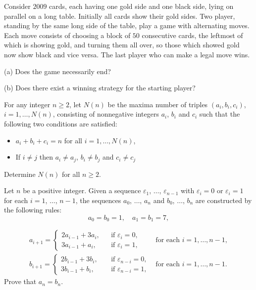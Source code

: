 \item[\textbf{C1.}]
Consider 
$2009$
 cards, each having one gold side and one black side, lying on parallel on a long table. Initially all cards show their gold sides. Two player, standing by the same long side of the table, play a game with alternating moves. Each move consists of choosing a block of 
$50$
 consecutive cards, the leftmost of which is showing gold, and turning them all over, so those which showed gold now show black and vice versa. The last player who can make a legal move wins.

(a) Does the game necessarily end?

(b) Does there exist a winning strategy for the starting player?

\item[\textbf{C2.}]
For any integer 
$n\geq 2$, 
 let 
$N(n)$
 be the maxima number of triples 
$(a_i, b_i, c_i)$, 
$i=1, \ldots, N(n)$, 
 consisting of nonnegative integers 
$a_i$, 
$b_i$
 and 
$c_i$
 such  that the following two conditions are satisfied:

\begin{itemize}
\item $a_i+b_i+c_i=n$
 for all 
$i=1, \ldots, N(n)$, 

\item If 
$i\neq j$
 then 
$a_i\neq a_j$, 
$b_i\neq b_j$
 and 
$c_i\neq c_j$
\end{itemize}

Determine 
$N(n)$
 for all 
$n\geq 2$.

\item[\textbf{C3.}]
Let 
$n$
 be a positive integer.  Given a sequence 
$\varepsilon_1$, 
$\dots$, 
$\varepsilon_{n - 1}$
 with 
$\varepsilon_i = 0$
 or 
$\varepsilon_i = 1$
 for each 
$i = 1$, 
$\dots$, 
$n - 1$, 
 the sequences 
$a_0$, 
$\dots$, 
$a_n$
 and 
$b_0$, 
$\dots$, 
$b_n$
 are constructed by the following rules: 
\[a_0 = b_0 = 1, \quad a_1 = b_1 = 7,\]
 
\[\begin{array}{lll}
	a_{i+1} = 
	\begin{cases}
		2a_{i-1} + 3a_i, \\
		3a_{i-1} + a_i, 
	\end{cases} & 
        \begin{array}{l} 
                \text{if } \varepsilon_i = 0, \\  
                \text{if } \varepsilon_i = 1, \end{array}
         & \text{for each } i = 1, \dots, n - 1, \\[15pt]
        b_{i+1}= 
        \begin{cases}
		2b_{i-1} + 3b_i, \\
		3b_{i-1} + b_i, 
	\end{cases} & 
        \begin{array}{l} 
                \text{if } \varepsilon_{n-i} = 0, \\  
                \text{if } \varepsilon_{n-i} = 1, \end{array}
         & \text{for each } i = 1, \dots, n - 1.
	\end{array}\]
  Prove that
$a_n = b_n$.


